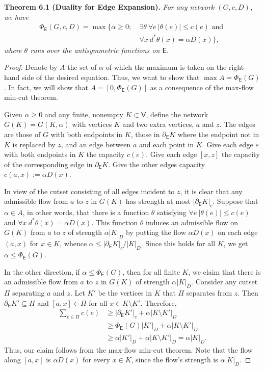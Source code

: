 \documentclass[11pt]{article}
\newcommand{\V}{\mathsf V}
\newcommand{\E}{\mathsf E}
\newcommand{\PE}{\Phi_{\E}}
\begin{document}
\medskip\noindent\textbf{Theorem 6.1 (Duality for Edge Expansion).}
\textit{For any network $(G,c,D)$, we have}
\[
\begin{split}
\PE(G,c,D)=\max\bigl\{\alpha\geq0;\ &\exists\theta\ \forall e\ |\theta(e)|\leq c(e)\text{ and }\\
&\forall x\ d^*\theta(x)=\alpha D(x)\bigr\},
\end{split}
\]
\textit{where $\theta$ runs over the antisymmetric functions on $\E$.}
\begin{proof}
Denote by $A$ the set of $\alpha$ of which the maximum is taken on the right-hand side of the desired equation. Thus, we want to show that $\max A=\PE(G)$. In fact, we will show that $A=[0,\PE(G)]$ as a consequence of the max-flow min-cut theorem.

Given $\alpha\geq0$ and any finite, nonempty $K\subset\V$, define the network $G(K)=G(K,\alpha)$ with vertices $K$ and two extra vertices, $a$ and $z$. The edges are those of $G$ with both endpoints in $K$, those in $\partial_{\E}K$ where the endpoint not in $K$ is replaced by $z$, and an edge between $a$ and each point in $K$. Give each edge $e$ with both endpoints in $K$ the capacity $c(e)$. Give each edge $[x,z]$ the capacity of the corresponding edge in $\partial_{\E}K$. Give the other edges capacity $c(a,x):=\alpha D(x)$.

In view of the cutset consisting of all edges incident to $z$, it is clear that any admissible flow from $a$ to $z$ in $G(K)$ has strength at most $|\partial_{\E}K|_c$. Suppose that $\alpha\in A$, in other words, that there is a function $\theta$ satisfying $\forall e\ |\theta(e)|\leq c(e)$ and $\forall x\ d^*\theta(x)=\alpha D(x)$. This function $\theta$ induces an admissible flow on $G(K)$ from $a$ to $z$ of strength $\alpha|K|_D$ by putting the flow $\alpha D(x)$ on each edge $(a,x)$ for $x\in K$, whence $\alpha\leq|\partial_{\E}K|_c/|K|_D$. Since this holds for all $K$, we get $\alpha\leq\PE(G)$.

In the other direction, if $\alpha\leq\PE(G)$, then for all finite $K$, we claim that there is an admissible flow from $a$ to $z$ in $G(K)$ of strength $\alpha|K|_D$. Consider any cutset $\Pi$ separating $a$ and $z$. Let $K'$ be the vertices in $K$ that $\Pi$ separates from $z$. Then $\partial_{\E}K'\subseteq\Pi$ and $[a,x]\in\Pi$ for all $x\in K\setminus K'$. Therefore,
\[
\begin{aligned}
\sum_{e\in\Pi}c(e)
&\geq|\partial_{\E}K'|_c+\alpha|K\setminus K'|_D\\
&\geq\PE(G)|K'|_D+\alpha|K\setminus K'|_D\\
&\geq\alpha|K'|_D+\alpha|K\setminus K'|_D=\alpha|K|_D.
\end{aligned}
\]
Thus, our claim follows from the max-flow min-cut theorem. Note that the flow along $[a,x]$ is $\alpha D(x)$ for every $x\in K$, since the flow's strength is $\alpha|K|_D$.


\end{proof}
\end{document}
